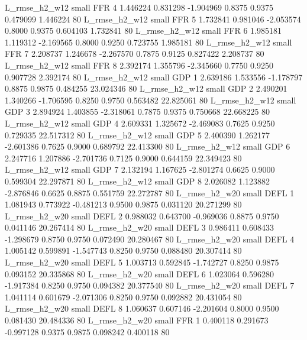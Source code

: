  L_rmse_h2_w12      small      FFR                 4 1.446224 0.831298 -1.904969 0.8375 0.9375  0.479099    1.446224 80
 L_rmse_h2_w12      small      FFR                 5 1.732841 0.981046 -2.053574 0.8000 0.9375  0.604103    1.732841 80
 L_rmse_h2_w12      small      FFR                 6 1.985181 1.119312 -2.169565 0.8000 0.9250  0.723755    1.985181 80
 L_rmse_h2_w12      small      FFR                 7 2.208737 1.246678 -2.267570 0.7875 0.9125  0.827422    2.208737 80
 L_rmse_h2_w12      small      FFR                 8 2.392174 1.355796 -2.345660 0.7750 0.9250  0.907728    2.392174 80
 L_rmse_h2_w12      small      GDP                 1 2.639186 1.533556 -1.178797 0.8875 0.9875  0.484255   23.024346 80
 L_rmse_h2_w12      small      GDP                 2 2.490201 1.340266 -1.706595 0.8250 0.9750  0.563482   22.825061 80
 L_rmse_h2_w12      small      GDP                 3 2.894924 1.403855 -2.318061 0.7875 0.9375  0.750668   22.668225 80
 L_rmse_h2_w12      small      GDP                 4 2.609331 1.325672 -2.469083 0.7625 0.9250  0.729335   22.517312 80
 L_rmse_h2_w12      small      GDP                 5 2.400390 1.262177 -2.601386 0.7625 0.9000  0.689792   22.413300 80
 L_rmse_h2_w12      small      GDP                 6 2.247716 1.207886 -2.701736 0.7125 0.9000  0.644159   22.349423 80
 L_rmse_h2_w12      small      GDP                 7 2.132194 1.167625 -2.801274 0.6625 0.9000  0.599304   22.297871 80
 L_rmse_h2_w12      small      GDP                 8 2.026082 1.123882 -2.876846 0.6625 0.8875  0.551759   22.272787 80
 L_rmse_h2_w20      small     DEFL                 1 1.081943 0.773922 -0.481213 0.9500 0.9875  0.031120   20.271299 80
 L_rmse_h2_w20      small     DEFL                 2 0.988032 0.643700 -0.969036 0.8875 0.9750  0.041146   20.267414 80
 L_rmse_h2_w20      small     DEFL                 3 0.986411 0.608433 -1.298679 0.8750 0.9750  0.072490   20.280467 80
 L_rmse_h2_w20      small     DEFL                 4 1.005142 0.599891 -1.547743 0.8250 0.9750  0.088480   20.307414 80
 L_rmse_h2_w20      small     DEFL                 5 1.003713 0.592845 -1.742727 0.8250 0.9875  0.093152   20.335868 80
 L_rmse_h2_w20      small     DEFL                 6 1.023064 0.596280 -1.917384 0.8250 0.9750  0.094382   20.377540 80
 L_rmse_h2_w20      small     DEFL                 7 1.041114 0.601679 -2.071306 0.8250 0.9750  0.092882   20.431054 80
 L_rmse_h2_w20      small     DEFL                 8 1.060637 0.607146 -2.201604 0.8000 0.9500  0.081430   20.484336 80
 L_rmse_h2_w20      small      FFR                 1 0.400118 0.291673 -0.997128 0.9375 0.9875  0.098242    0.400118 80
